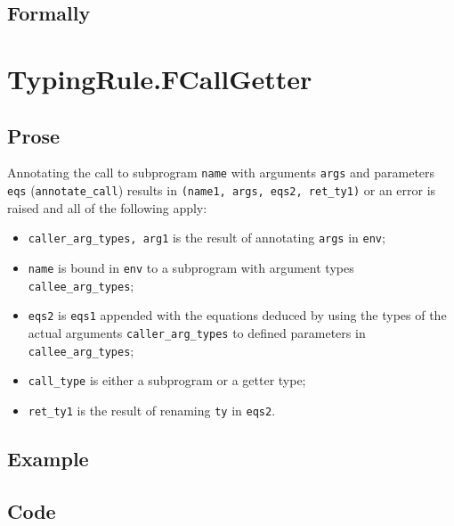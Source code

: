 \documentclass{book}
\begin{document}
\begin{emptyformal}
    \subsection{Formally}
\end{emptyformal}


\section{TypingRule.FCallGetter \label{sec:TypingRule.FCallGetter}}

  \subsection{Prose}
  Annotating the call to subprogram \texttt{name} with arguments \texttt{args}
and parameters \texttt{eqs} (\texttt{annotate\_call}) results in
\texttt{(name1, args, eqs2, ret\_ty1)} or an error is raised and all of the following apply:
   \begin{itemize}
   \item \texttt{caller\_arg\_types, arg1} is the result of annotating \texttt{args} in \texttt{env};
   \item \texttt{name} is bound in \texttt{env} to a subprogram with argument types
      \texttt{callee\_arg\_types};
   \item \texttt{eqs2} is \texttt{eqs1} appended with the equations deduced by
     using the types of the actual arguments \texttt{caller\_arg\_types} to
     defined parameters in \texttt{callee\_arg\_types};
   \item \texttt{call\_type} is either a subprogram or a getter type;
   \item \texttt{ret\_ty1} is the result of renaming \texttt{ty} in \texttt{eqs2}.
   \end{itemize}

  \subsection{Example}

  \subsection{Code}
\end{document}
